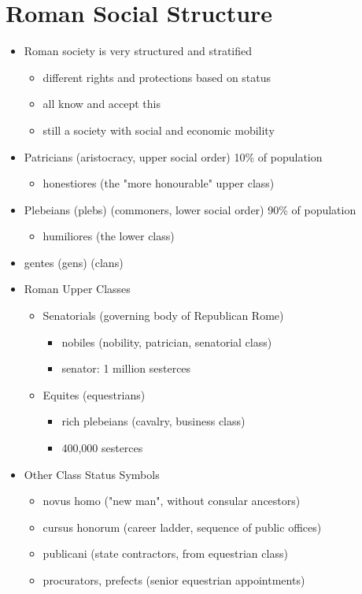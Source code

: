 \documentclass[12pt, twoside]{article}
\begin{document}
\section{Roman Social Structure}
\begin{itemize}
\item Roman society is very structured and stratified
	\begin{itemize}
	\item different rights and protections based on status
	\item all know and accept this
	\item still a society with social and economic mobility
	\end{itemize}
\item Patricians (aristocracy, upper social order) 10\% of population
	\begin{itemize}
	\item honestiores (the "more honourable" upper class)
	\end{itemize}
\item Plebeians (plebs) (commoners, lower social order) 90\% of population
	\begin{itemize}
	\item humiliores (the lower class)
	\end{itemize}
\item gentes (gens) (clans)
\item Roman Upper Classes
	\begin{itemize}
	\item Senatorials (governing body of Republican Rome)
		\begin{itemize}
		\item nobiles (nobility, patrician, senatorial class)
		\item senator: 1 million sesterces
		\end{itemize}
	\item Equites (equestrians) 
		\begin{itemize}
		\item rich plebeians (cavalry, business class) 
		\item 400,000 sesterces
		\end{itemize}
	\end{itemize}
\item Other Class Status Symbols
	\begin{itemize}
	\item novus homo ("new man", without consular ancestors)
	\item cursus honorum (career ladder, sequence of public offices)
	\item publicani (state contractors, from equestrian class)
	\item procurators, prefects (senior equestrian appointments)
	\end{itemize}
\end{itemize}
\end{document}
